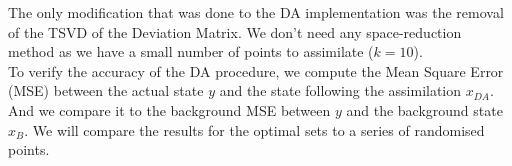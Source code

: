 The only modification that was done to the DA implementation was the removal of the TSVD of the Deviation Matrix. We don't need any space-reduction method as we have a small number of points to assimilate ($k=10$).  \\


To verify the accuracy of the DA procedure, we compute the Mean Square Error (MSE) between the actual state $y$ and the state following the assimilation $x_{DA}$. And we compare it to the background MSE between $y$ and the background state $x_{B}$. We will compare the results for the optimal sets to a series of randomised points. 

